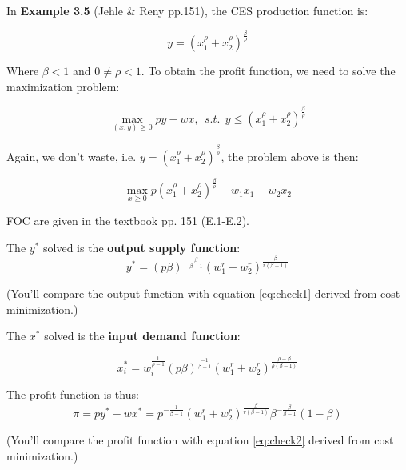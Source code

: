 \documentclass{article}
\begin{document}
\vspace{2mm}

\begin{mdframed}[backgroundcolor=blue!20,linecolor=white]

In \textbf{Example 3.5} (Jehle \& Reny pp.151), the CES production function is:

$$y = (x_1^\rho + x_2^\rho)^{\frac{\beta}{\rho}}$$

Where $\beta < 1$ and $0 \ne \rho <1$. To obtain the profit function, we need to solve the maximization problem:


$$\max_{(x,y) \ge 0} py - wx, \ \ s.t. \ \ y \le (x_1^\rho + x_2^\rho)^{\frac{\beta}{\rho}}$$

Again, we don't waste, i.e. $ y = (x_1^\rho + x_2^\rho)^{\frac{\beta}{\rho}}$, the problem above is then:

$$\max_{x \ge 0} p(x_1^\rho + x_2^\rho)^{\frac{\beta}{\rho}} - w_1x_1 - w_2x_2$$

FOC are given in the textbook pp. 151 (E.1-E.2). 

The $y^*$ solved is the \textbf{output supply function}:
\begin{equation}
y^* = (p\beta)^{-\frac{\beta}{\beta - 1}}(w_1^r + w_2^r)^{\frac{\beta}{r(\beta - 1)}}
    \label{eq:E5}   
\end{equation}

(You'll compare the output function with equation \ref{eq:check1} derived from cost minimization.)

The $x^*$ solved is the \textbf{input demand function}:

\begin{equation}
x_i^* = w_i^{\frac{1}{\rho -1}}  (p\beta)^{\frac{-1}{\beta - 1}}(w_1^r + w_2^r)^{\frac{\rho -\beta}{\rho(\beta -1)}}
    \label{eq:E6}   
\end{equation}



The profit function is thus:
\begin{equation}
\pi = py^* - wx^* = p^{-\frac{1}{\beta - 1}} (w_1^r + w_2^r)^{\frac{\beta}{r(\beta - 1)}}\beta^{-\frac{\beta}{\beta - 1}}(1-\beta)
    \label{eq:E7}   
\end{equation}

(You'll compare the profit function with equation \ref{eq:check2} derived from cost minimization.)

\end{mdframed}

\vspace{2mm}
\end{document}
